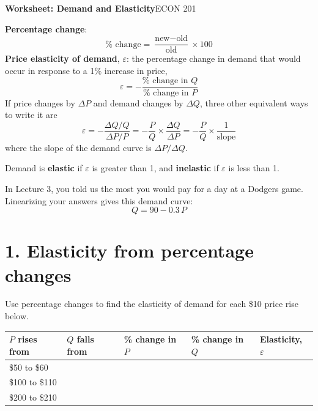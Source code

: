 \documentclass[11pt]{article}
\begin{document}
{\LARGE\bfseries\color{accent} Worksheet: Demand and Elasticity}\hfill{\large ECON 201}

\newcommand{\term}[1]{\textcolor{accentdark}{\textbf{#1}}}

\begin{tcolorbox}[colback=cream, colframe=accent, boxrule=0.6pt, arc=2pt,
  left=6pt, right=6pt, top=4pt, bottom=4pt, title=Definitions,
  fonttitle=\bfseries, coltitle=white]
\term{Percentage change}:
\[
  \%\text{ change} = \frac{\text{new} - \text{old}}{\text{old}} \times 100
\]
\term{Price elasticity of demand}, $\varepsilon$: the percentage change in
demand that would occur in response to a 1\% increase in price,
\[
  \varepsilon = -\frac{\%\text{ change in } Q}{\%\text{ change in } P}
\]
If price changes by $\Delta P$ and demand changes by $\Delta Q$, three other
equivalent ways to write it are
\[
  \varepsilon = -\frac{\Delta Q / Q}{\Delta P / P}
  = -\frac{P}{Q} \times \frac{\Delta Q}{\Delta P}
  = -\frac{P}{Q} \times \frac{1}{\text{slope}}
\]
where the slope of the demand curve is $\Delta P / \Delta Q$.

Demand is \term{elastic} if $\varepsilon$ is greater than 1, and
\term{inelastic} if $\varepsilon$ is less than 1.
\end{tcolorbox}

In Lecture 3, you told us the most you would pay for a day at a Dodgers game.
Linearizing your answers gives this demand curve:
\[
  Q = 90 - 0.3\,P
\]

\section{1. Elasticity from percentage changes}

Use percentage changes to find the elasticity of demand for each \$10 price
rise below.

\begin{center}
\renewcommand{\arraystretch}{1.5}
\begin{tabular}{|>{\raggedright\arraybackslash}p{2.9cm}|D|D|D|D|}
\hline
$P$ rises from & $Q$ falls from & \% change in $P$ & \% change in $Q$ & Elasticity, $\varepsilon$ \\
\hline
\$50 to \$60 & \rule{0pt}{1.8em} & & & \\
\hline
\$100 to \$110 & \rule{0pt}{1.8em} & & & \\
\hline
\$200 to \$210 & \rule{0pt}{1.8em} & & & \\
\hline
\end{tabular}
\end{center}
\end{document}
